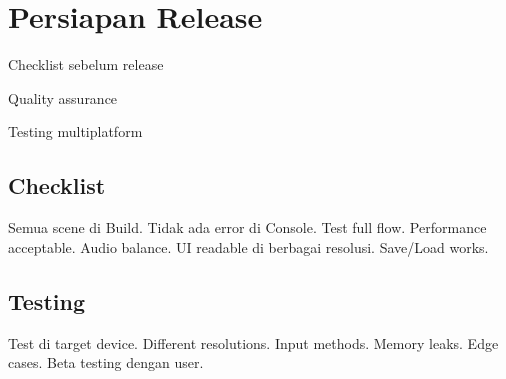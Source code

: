 \section{Persiapan Release}

\begin{learningoutcomes}
\item Checklist sebelum release
\item Quality assurance
\item Testing multiplatform
\end{learningoutcomes}

\subsection{Checklist}

Semua scene di Build. Tidak ada error di Console. Test full flow. Performance acceptable. Audio balance. UI readable di berbagai resolusi. Save/Load works.

\subsection{Testing}

Test di target device. Different resolutions. Input methods. Memory leaks. Edge cases. Beta testing dengan user.
